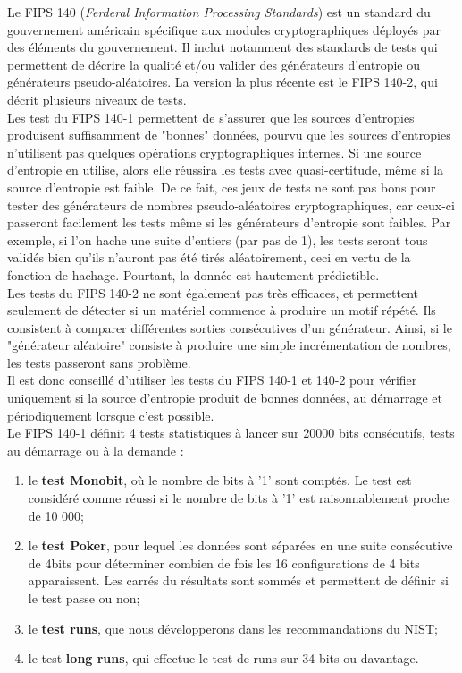 		Le FIPS 140 (\textit{Ferderal Information Processing Standards}) est un standard du gouvernement américain spécifique aux modules cryptographiques déployés par des éléments du gouvernement. Il inclut notamment des standards de tests qui permettent de décrire la qualité et/ou valider des générateurs d'entropie ou générateurs pseudo-aléatoires. La version la plus récente est le FIPS 140-2, qui décrit plusieurs niveaux de tests.\\
		
		
		Les test du FIPS 140-1 permettent de s'assurer que les sources d'entropies produisent suffisamment de "bonnes" données, pourvu que les sources d'entropies n'utilisent pas quelques opérations cryptographiques internes. Si une source d'entropie en utilise, alors elle réussira les tests avec quasi-certitude, même si la source d'entropie est faible. De ce fait, ces jeux de tests ne sont pas bons pour tester des générateurs de nombres pseudo-aléatoires cryptographiques, car ceux-ci passeront facilement les tests même si les générateurs d'entropie sont faibles. Par exemple, si l'on hache une suite d'entiers (par pas de 1), les tests seront tous validés bien qu'ils n'auront pas été tirés aléatoirement, ceci en vertu de la fonction de hachage. Pourtant, la donnée est hautement prédictible.\\
		
		
		Les tests du FIPS 140-2 ne sont également pas très efficaces, et permettent seulement de détecter si un matériel commence à produire un motif répété. Ils consistent à comparer différentes sorties consécutives d'un générateur. Ainsi, si le "générateur aléatoire" consiste à produire une simple incrémentation de nombres, les tests passeront sans problème.\\
		
		
		Il est donc conseillé d'utiliser les tests du FIPS 140-1 et 140-2 pour vérifier uniquement si la source d'entropie produit de bonnes données, au démarrage et périodiquement lorsque c'est possible. \\
		
		
		
		Le FIPS 140-1 définit 4 tests statistiques à lancer sur 20000 bits consécutifs, tests au démarrage ou à la demande : 
		\begin{enumerate}
		\item le \textbf{test Monobit}, où le nombre de bits à '1' sont comptés. Le test est considéré comme réussi si le nombre de bits à '1' est raisonnablement proche de 10 000;
		\item le \textbf{test Poker}, pour lequel les données sont séparées en une suite consécutive de 4bits pour déterminer combien de fois les 16 configurations de 4 bits apparaissent. Les carrés du résultats sont sommés et permettent de définir si le test passe ou non; 
		\item le \textbf{test runs}, que nous développerons dans les recommandations du NIST;
		\item le test \textbf{long runs}, qui effectue le test de runs sur 34 bits ou davantage.\\
		\end{enumerate}
		
